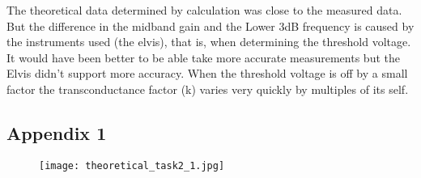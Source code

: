 The theoretical data determined by calculation was close to the measured data. But the difference in the midband gain and the Lower 3dB frequency is caused by the instruments used (the elvis), that is, when determining the threshold voltage. It would have been better to be able take more accurate measurements but the Elvis didn't support more accuracy. When the threshold voltage is off by a small factor the  transconductance factor (k) varies very quickly by multiples of its self. 


\pagebreak
\subsection*{Appendix 1}
\begin{figure}[h!]
\texttt{[image: theoretical\_task2\_1.jpg]}
\end{figure}
